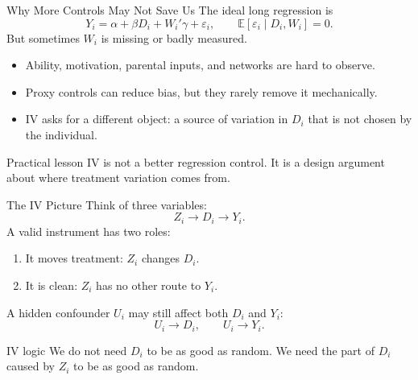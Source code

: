 \documentclass[11pt,aspectratio=169]{beamer}
\newcommand{\E}{\mathbb{E}}
\begin{document}
\begin{frame}{Why More Controls May Not Save Us}
  The ideal long regression is
  \[
    Y_i = \alpha + \beta D_i + W_i'\gamma + \varepsilon_i,
    \qquad
    \E[\varepsilon_i\mid D_i,W_i]=0.
  \]
  But sometimes \(W_i\) is missing or badly measured.

  \begin{itemize}
    \item Ability, motivation, parental inputs, and networks are hard to observe.
    \item Proxy controls can reduce bias, but they rarely remove it mechanically.
    \item IV asks for a different object: a source of variation in \(D_i\) that is not chosen by the individual.
  \end{itemize}

  \begin{block}{Practical lesson}
    IV is not a better regression control. It is a design argument about where treatment variation comes from.
  \end{block}
\end{frame}

\begin{frame}{The IV Picture}
  Think of three variables:
  \[
    Z_i \longrightarrow D_i \longrightarrow Y_i.
  \]
  A valid instrument has two roles:
  \begin{enumerate}
    \item It moves treatment: \(Z_i\) changes \(D_i\).
    \item It is clean: \(Z_i\) has no other route to \(Y_i\).
  \end{enumerate}

  \vspace{0.3em}
  A hidden confounder \(U_i\) may still affect both \(D_i\) and \(Y_i\):
  \[
    U_i \longrightarrow D_i,
    \qquad
    U_i \longrightarrow Y_i.
  \]

  \begin{block}{IV logic}
    We do not need \(D_i\) to be as good as random. We need the part of \(D_i\) caused by \(Z_i\) to be as good as random.
  \end{block}
\end{frame}
\end{document}
